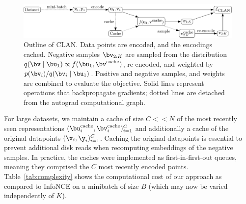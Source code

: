 \begin{figure}[t]
	\includegraphics[width=.95\textwidth]{figures/data_flow.pdf}
	\caption{Outline of CLAN. Data points are encoded, and the encodings cached. Negative samples $\bv_{2:K}$ are sampled from the distribution $q(\bv \mid \bu_1) \propto f(\bu_1, \bv^{\text{cache}})$, re-encoded, and weighted by $p(\bv_i)/q(\bv_i\mid\bu_1)$. Positive and negative samples, and weights are combined to evaluate the objective. Solid lines represent operations that backpropagate gradients; dotted lines are detached from the autograd computational graph.}
	\label{fig:clan_data_flow}
\end{figure}

For large datasets, we maintain a cache of size $C << N$ of  the most recently seen representations $(\bu^\text{cache}_i, \bv^\text{cache}_i)_{i=1}^C$ and additionally a cache of the original datapoints $(\x_i,\y_i)_{i=1}^C$.
Caching the original datapoints is essential to prevent additional disk reads when recomputing embeddings of the negative samples.
In practice, the caches were implemented as first-in-first-out queues, meaning they comprised the $C$ most recently encoded points. Table~\ref{tab:complexity} shows the computational cost of our approach as compared to InfoNCE on a minibatch of size $B$ (which may now be varied independently of $K$).



%
%


